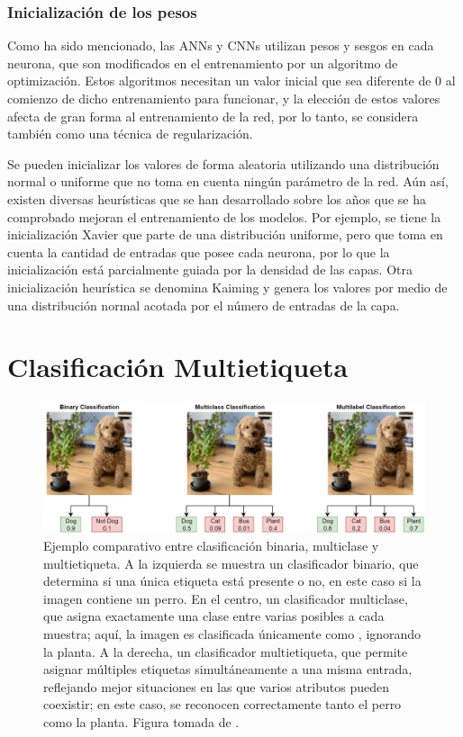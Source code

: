 \subsubsection{Inicialización de los pesos}
Como ha sido mencionado, las ANNs y CNNs utilizan pesos y sesgos en cada neurona, que son modificados en el entrenamiento por un algoritmo de optimización. Estos algoritmos necesitan un valor inicial que sea diferente de 0 al comienzo de dicho entrenamiento para funcionar, y la elección de estos valores afecta de gran forma al entrenamiento de la red, por lo tanto, se considera también como una técnica de regularización.

Se pueden inicializar los valores de forma aleatoria utilizando una distribución normal o uniforme que no toma en cuenta ningún parámetro de la red. Aún así, existen diversas heurísticas que se han desarrollado sobre los años que se ha comprobado mejoran el entrenamiento de los modelos. Por ejemplo, se tiene la inicialización Xavier \cite{glorot2010understanding} que parte de una distribución uniforme, pero que toma en cuenta la cantidad de entradas que posee cada neurona, por lo que la inicialización está parcialmente guiada por la densidad de las capas. Otra inicialización heurística se denomina Kaiming \cite{he2015delving} y genera los valores por medio de una distribución normal acotada por el número de entradas de la capa.

\FloatBarrier

\section{Clasificación Multietiqueta}
\label{section2:multilabel}

\begin{figure}[htb]
    \includegraphics[width=\linewidth]{figures/2_theory/multilabel_example.png}
    \caption[Ejemplo comparativo entre clasificación binaria, multiclase y multietiqueta]{Ejemplo comparativo entre clasificación binaria, multiclase y multietiqueta. A la izquierda se muestra un clasificador binario, que determina si una única etiqueta está presente o no, en este caso si la imagen contiene un perro. En el centro, un clasificador multiclase, que asigna exactamente una clase entre varias posibles a cada muestra; aquí, la imagen es clasificada únicamente como , ignorando la planta. A la derecha, un clasificador multietiqueta, que permite asignar múltiples etiquetas simultáneamente a una misma entrada, reflejando mejor situaciones en las que varios atributos pueden coexistir; en este caso, se reconocen correctamente tanto el perro como la planta. Figura tomada de \cite{noauthor_multilabel_nodate}.}
    \label{multilabel_example}
\end{figure}

